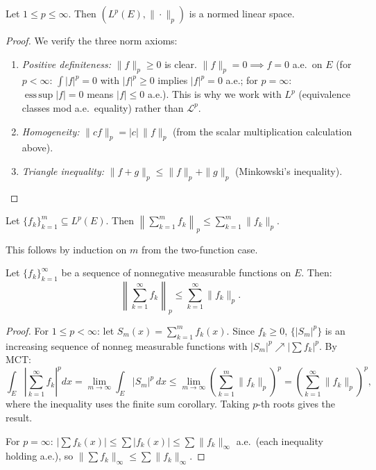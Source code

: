 \documentclass[11pt]{report}
\begin{document}
\begin{thmbox}
Let $1 \leq p \leq \infty$. Then $(L^p(E), \|\cdot\|_p)$ is a normed linear space.
\end{thmbox}

\begin{proof}
We verify the three norm axioms:
\begin{enumerate}[label=(\roman*)]
\item \textit{Positive definiteness:} $\|f\|_p \geq 0$ is clear. $\|f\|_p = 0 \implies f = 0$ a.e.\ on $E$ (for $p < \infty$: $\int |f|^p = 0$ with $|f|^p \geq 0$ implies $|f|^p = 0$ a.e.; for $p = \infty$: $\operatorname{ess\,sup}|f| = 0$ means $|f| \leq 0$ a.e.). This is why we work with $L^p$ (equivalence classes mod a.e.\ equality) rather than $\mathcal{L}^p$.
\item \textit{Homogeneity:} $\|cf\|_p = |c|\,\|f\|_p$ (from the scalar multiplication calculation above).
\item \textit{Triangle inequality:} $\|f + g\|_p \leq \|f\|_p + \|g\|_p$ (Minkowski's inequality). \qedhere
\end{enumerate}
\end{proof}

\begin{corbox}
Let $\{f_k\}_{k=1}^m \subseteq L^p(E)$. Then $\left\|\sum_{k=1}^{m} f_k\right\|_p \leq \sum_{k=1}^{m} \|f_k\|_p$.
\end{corbox}

This follows by induction on $m$ from the two-function case.

\begin{corbox}
Let $\{f_k\}_{k=1}^{\infty}$ be a sequence of nonnegative measurable functions on $E$. Then:
\[
\left\|\sum_{k=1}^{\infty} f_k\right\|_p \leq \sum_{k=1}^{\infty} \|f_k\|_p.
\]
\end{corbox}

\begin{proof}
For $1 \leq p < \infty$: let $S_m(x) = \sum_{k=1}^m f_k(x)$. Since $f_k \geq 0$, $\{|S_m|^p\}$ is an increasing sequence of nonneg measurable functions with $|S_m|^p \nearrow |\sum f_k|^p$. By MCT:
\[
\int_E \left|\sum_{k=1}^{\infty} f_k\right|^p dx = \lim_{m \to \infty} \int_E |S_m|^p\,dx \leq \lim_{m \to \infty} \left(\sum_{k=1}^{m} \|f_k\|_p\right)^p = \left(\sum_{k=1}^{\infty} \|f_k\|_p\right)^p,
\]
where the inequality uses the finite sum corollary. Taking $p$-th roots gives the result.

For $p = \infty$: $|\sum f_k(x)| \leq \sum |f_k(x)| \leq \sum \|f_k\|_\infty$ a.e.\ (each inequality holding a.e.), so $\|\sum f_k\|_\infty \leq \sum \|f_k\|_\infty$.
\end{proof}
\end{document}
